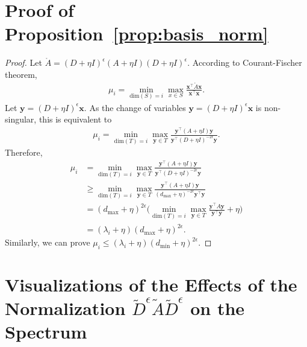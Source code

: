 \documentclass[nohyperref]{article}
\theoremstyle{plain}
\theoremstyle{definition}
\theoremstyle{remark}
\begin{document}
\section{Proof of Proposition~\ref{prop:basis_norm}}
\label{proof:prop:basis_norm}

\begin{proof}
	Let $\mathring A=(D+\eta I)^{\epsilon}(A+\eta I)(D+\eta I)^{\epsilon}$.
	According to Courant-Fischer theorem,
	\begin{equation}
		\nonumber
		\begin{aligned}
			\mu_i=\min_{\mathrm{dim}(S)=i} \max_{x\in S}\frac{\bm x^{\top}\mathring A\bm x}{\bm x^{\top}\bm x}.
		\end{aligned}
	\end{equation}
	Let $\bm y=(D+\eta I)^{\epsilon}\bm x$. As the change of variables $\bm y=(D+\eta I)^{\epsilon}\bm x$ is non-singular, this is equivalent to
	\begin{equation}
		\nonumber
		\begin{aligned}
			\mu_i=\min_{\mathrm{dim}(T)=i} \max_{\bm y\in T}\frac{\bm y^{\top}(A+\eta I)\bm y}{\bm y^{\top}(D+\eta I)^{-2\epsilon}\bm y}.
		\end{aligned}
	\end{equation}
	Therefore,
	\begin{equation}
		\nonumber
		\begin{aligned}
			\mu_i&=\min_{\mathrm{dim}(T)=i} \max_{\bm y\in T}\frac{\bm y^{\top}(A+\eta I)\bm y}{\bm y^{\top}(D+\eta I)^{-2\epsilon}\bm y}\\
			&\geq\min_{\mathrm{dim}(T)=i} \max_{\bm y\in T}\frac{\bm y^{\top}(A+\eta I)\bm y}{(d_{\mathrm{max}}+\eta)^{-2\epsilon}\bm y^{\top}\bm y}\\
			&=(d_{\mathrm{max}}+\eta)^{2\epsilon}\bigl(\min_{\mathrm{dim}(T)=i} \max_{\bm y\in T}\frac{\bm y^{\top}A\bm y}{\bm y^{\top}\bm y}+\eta\bigr)\\
			&=(\lambda_i+\eta)(d_{\mathrm{max}}+\eta)^{2\epsilon}.
		\end{aligned}
	\end{equation}
	Similarly, we can prove $\mu_i\leq(\lambda_i+\eta)(d_{\mathrm{min}}+\eta)^{2\epsilon}$.
\end{proof}

\FloatBarrier
\section{Visualizations of the Effects of the Normalization $\tilde D^{\epsilon}\tilde A\tilde D^{\epsilon}$ on the Spectrum}
\label{spectrum_visualizations}
\end{document}
